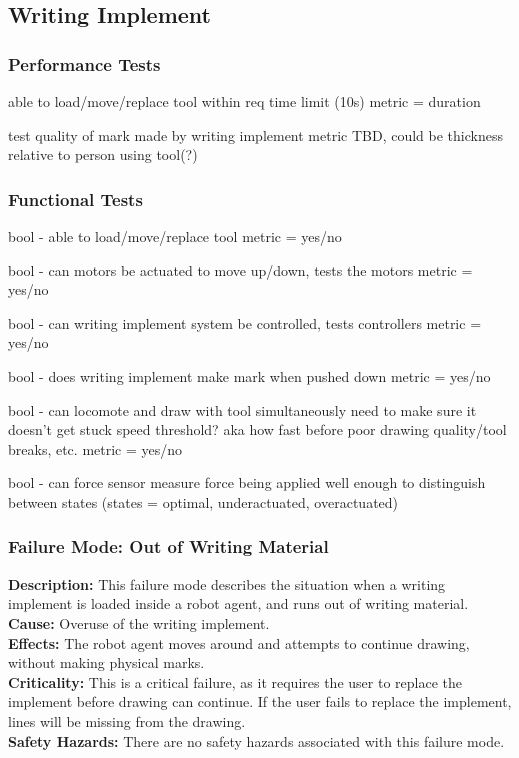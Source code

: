 
\subsection{Writing Implement}
\label{sec:verification_writing_implement}

\subsubsection{Performance Tests}
\label{sec:writing_pt}
able to load/move/replace tool within req time limit (10s)
metric = duration

test quality of mark made by writing implement
metric TBD, could be thickness relative to person using tool(?)


\subsubsection{Functional Tests}
\label{sec:writing_ft}
bool - able to load/move/replace tool
metric = yes/no

bool - can motors be actuated to move up/down, tests the motors
metric = yes/no

bool - can writing implement system be controlled, tests controllers
metric = yes/no

bool - does writing implement make mark when pushed down
metric = yes/no

bool - can locomote and draw with tool simultaneously
need to make sure it doesn't get stuck
speed threshold? aka how fast before poor drawing quality/tool breaks, etc.
metric = yes/no

bool - can force sensor measure force being applied well enough to distinguish between states (states = optimal, underactuated, overactuated)


\subsubsection{Failure Mode: Out of Writing Material}
\label{sec:writing_fm_ink}
\textbf{Description:} This failure mode describes the situation when a writing implement is loaded inside a robot agent, and runs out of writing material. \\
\textbf{Cause:} Overuse of the writing implement.\\
\textbf{Effects:} The robot agent moves around and attempts to continue drawing, without making physical marks.\\
\textbf{Criticality:} This is a critical failure, as it requires the user to replace the implement before drawing can continue. If the user fails to replace the implement, lines will be missing from the drawing.\\
\textbf{Safety Hazards:} There are no safety hazards associated with this failure mode.\\

